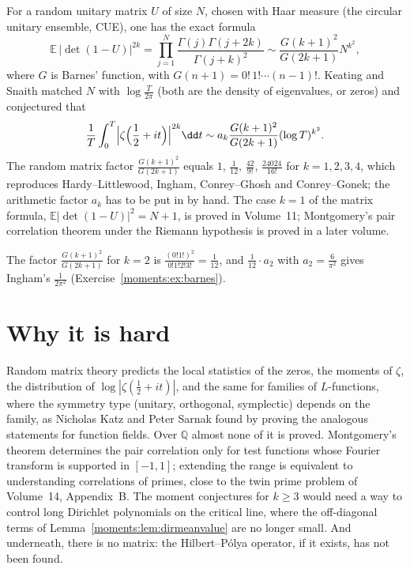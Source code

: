 \begin{remark}\label{moments:rem:keatingsnaith}
For a random unitary matrix $U$ of size $N$, chosen with Haar measure (the circular unitary ensemble, CUE), one has the exact formula
\[
\mathbb E\,|\det(1-U)|^{2k}=\prod_{j=1}^N\frac{\Gamma(j)\Gamma(j+2k)}{\Gamma(j+k)^2}\sim\frac{G(k+1)^2}{G(2k+1)}N^{k^2},
\]
where $G$ is Barnes' function, with $G(n+1)=0!\,1!\cdots(n-1)!$. Keating and Snaith matched $N$ with $\log\frac T{2\pi}$ (both are the density of
eigenvalues, or zeros) and conjectured that
\[
\frac1T\int_0^T\Bigl|\zeta\Bigl(\frac12+it\Bigr)\Bigr|^{2k}\dd t\sim a_k\frac{G(k+1)^2}{G(2k+1)}(\log T)^{k^2}.
\]
The random matrix factor $\frac{G(k+1)^2}{G(2k+1)}$ equals $1$, $\frac1{12}$, $\frac{42}{9!}$, $\frac{24024}{16!}$ for $k=1,2,3,4$, which reproduces Hardy--Littlewood,
Ingham, Conrey--Ghosh and Conrey--Gonek; the arithmetic factor $a_k$ has to be put in by hand. The case $k=1$ of the matrix formula, $\mathbb E|\det(1-U)|^2=N+1$,
is proved in Volume~11; Montgomery's pair correlation theorem under the Riemann hypothesis is proved in a later volume.
\end{remark}

The factor $\frac{G(k+1)^2}{G(2k+1)}$ for $k=2$ is $\frac{(0!1!)^2}{0!1!2!3!}=\frac1{12}$, and $\frac1{12}\cdot a_2$ with $a_2=\frac6{\pi^2}$ gives Ingham's
$\frac1{2\pi^2}$ (Exercise~\ref{moments:ex:barnes}).

\section{Why it is hard}

Random matrix theory predicts the local statistics of the zeros, the moments of $\zeta$, the distribution of $\log|\zeta(\frac12+it)|$, and the same
for families of $L$-functions, where the symmetry type (unitary, orthogonal, symplectic) depends on the family, as Nicholas Katz and Peter Sarnak found by
proving the analogous statements for function fields. Over $\mathbb Q$ almost none of it is proved. Montgomery's theorem determines the pair correlation only
for test functions whose Fourier transform is supported in $[-1,1]$; extending the range is equivalent to understanding correlations of primes, close to
the twin prime problem of Volume~14, Appendix~B. The moment conjectures for $k\ge3$ would need a way to control long Dirichlet polynomials on the
critical line, where the off-diagonal terms of Lemma~\ref{moments:lem:dirmeanvalue} are no longer small. And underneath, there is no matrix: the
Hilbert--P\'olya operator, if it exists, has not been found.

